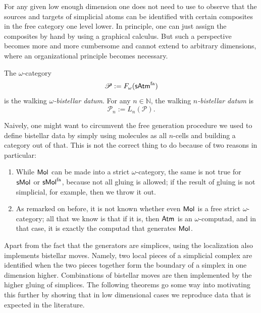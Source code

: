 \documentclass[12pt,a4paper]{article}
\numberwithin{equation}{section}
\newcommand{\atm}[2][s]{%
    \ifx b#1\mathsf{Atm}_{#2}\else
    \ifx s#1\mathsf{sAtm}_{#2}\else
    \ifx f#1\mathsf{sAtm}^{\mathrm{fa}}_{#2}\else
    \mathrm{Illegal~option}%
    \fi\fi\fi
}
\newcommand{\mol}[2][s]{%
    \ifx b#1\mathsf{Mol}_{#2}\else
    \ifx s#1\mathsf{sMol}_{#2}\else
    \ifx f#1\mathsf{sMol}^{\mathrm{fa}}_{#2}\else
    \mathrm{Illegal~option}%
    \fi\fi\fi
}
\begin{document}
\begin{remark}
    For any given low enough dimension one does not need to use  to observe that the sources and targets of simplicial atoms can be identified with certain composites in the free category one level lower. In principle, one can just assign the composites by hand by using a graphical calculus. But such a perspective becomes more and more cumbersome and cannot extend to arbitrary dimensions, where an organizational principle becomes necessary.
\end{remark}



\begin{definition}\label{def:bistellar_datum}
    The $\omega$-category
    \begin{equation}
        \mathscr{P} := F_{\omega} (\atm[f]{})
    \end{equation}
    is the walking \emph{$\omega$-bistellar datum}. For any $n \in \mathbb{N}$, the walking \emph{$n$-bistellar datum} is
    \begin{equation}
        \mathscr{P}_n := L_n (\mathscr{P}).
    \end{equation}
\end{definition}



\begin{remark}
    Naively, one might want to circumvent the free generation procedure we used to define bistellar data by simply using molecules as all $n$-cells and building a category out of that. This is not the correct thing to do because of two reasons in particular:
    \begin{enumerate}
        \item While $\mol[b]{}$ can be made into a strict $\omega$-category, the same is not true for $\mol{}$ or $\mol[f]{}$, because not all gluing is allowed; if the result of gluing is not simplicial, for example, then we throw it out.
        \item As remarked on before, it is not known whether even $\mol[b]{}$ is a free strict $\omega$-category; all that we know is that if it is, then $\atm[b]{}$ is an $\omega$-computad, and in that case, it is exactly the computad that generates $\mol[b]{}$.
    \end{enumerate}
\end{remark}



Apart from the fact that the generators are simplices, using the localization also implements bistellar moves. Namely, two local pieces of a simplicial complex are identified when the two pieces together form the boundary of a simplex in one dimension higher. Combinations of bistellar moves are then implemented by the higher gluing of simplices. The following theorems go some way into motivating this further by showing that in low dimensional cases we reproduce data that is expected in the literature.
\end{document}
